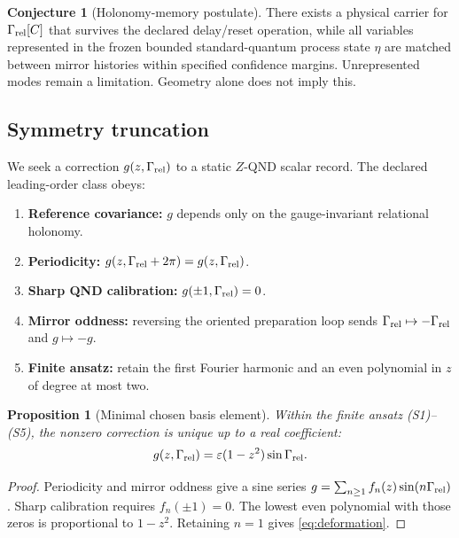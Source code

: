 \documentclass[10pt]{article}
\newtheorem{proposition}[theorem]{Proposition}
\theoremstyle{definition}
\newtheorem{conjecture}[theorem]{Conjecture}
\theoremstyle{remark}
\begin{document}
\begin{conjecture}[Holonomy-memory postulate]
\label{conj:holonomy-memory}
There exists a physical carrier for \(\Gamma_{\rm rel}[C]\) that survives the declared delay/reset operation, while all variables represented in the frozen bounded standard-quantum process state \(\eta\) are matched between mirror histories within specified confidence margins. Unrepresented modes remain a limitation. Geometry alone does not imply this.
\end{conjecture}

\subsection{Symmetry truncation}

We seek a correction \(g(z,\Gamma_{\rm rel})\) to a static \(Z\)-QND scalar record. The declared leading-order class obeys:
\begin{enumerate}[label=(S\arabic*)]
\item \textbf{Reference covariance:} \(g\) depends only on the gauge-invariant relational holonomy.
\item \textbf{Periodicity:} \(g(z,\Gamma_{\rm rel}+2\pi)=g(z,\Gamma_{\rm rel})\).
\item \textbf{Sharp QND calibration:} \(g(\pm1,\Gamma_{\rm rel})=0\).
\item \textbf{Mirror oddness:} reversing the oriented preparation loop sends \(\Gamma_{\rm rel}\mapsto-\Gamma_{\rm rel}\) and \(g\mapsto-g\).
\item \textbf{Finite ansatz:} retain the first Fourier harmonic and an even polynomial in \(z\) of degree at most two.
\end{enumerate}

\begin{proposition}[Minimal chosen basis element]
\label{prop:deformation}
Within the finite ansatz (S1)--(S5), the nonzero correction is unique up to a real coefficient:
\begin{equation}
  g(z,\Gamma_{\rm rel})
  =\varepsilon(1-z^2)\sin\Gamma_{\rm rel}.
  \label{eq:deformation}
\end{equation}
\end{proposition}

\begin{proof}
Periodicity and mirror oddness give a sine series
\(g=\sum_{n\ge1}f_n(z)\sin(n\Gamma_{\rm rel})\).
Sharp calibration requires \(f_n(\pm1)=0\). The lowest even polynomial with those zeros is proportional to \(1-z^2\). Retaining \(n=1\) gives \cref{eq:deformation}.
\end{proof}
\end{document}
